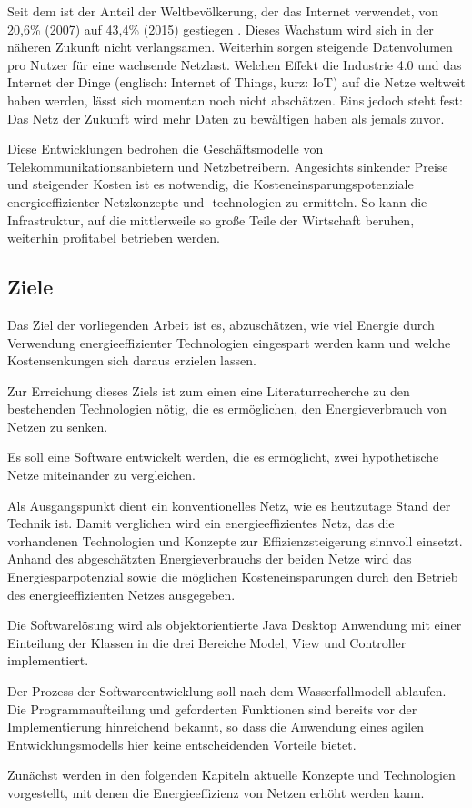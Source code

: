 Seit dem ist der Anteil der Weltbevölkerung, der das Internet verwendet, von 20,6\% (2007) auf 43,4\% (2015) gestiegen \cite{itu}. Dieses Wachstum wird sich in der näheren Zukunft nicht verlangsamen. Weiterhin sorgen steigende Datenvolumen pro Nutzer für eine wachsende Netzlast. Welchen Effekt die Industrie 4.0 und das Internet der Dinge (englisch: Internet of Things, kurz: IoT) auf die Netze weltweit haben werden, lässt sich momentan  noch nicht abschätzen. Eins jedoch steht fest: Das Netz der Zukunft wird mehr Daten zu bewältigen haben als jemals zuvor.

Diese Entwicklungen bedrohen die Geschäftsmodelle von Telekommunikationsanbietern und Netzbetreibern. Angesichts sinkender Preise und steigender Kosten ist es notwendig, die  Kosteneinsparungspotenziale energieeffizienter Netzkonzepte und -technologien zu ermitteln. So kann die Infrastruktur, auf die mittlerweile so große Teile der Wirtschaft beruhen, weiterhin profitabel betrieben werden.

\subsection{Ziele}
Das Ziel der vorliegenden Arbeit ist es, abzuschätzen, wie viel Energie  durch Verwendung energieeffizienter Technologien eingespart werden kann und welche Kostensenkungen sich daraus erzielen lassen.

Zur Erreichung dieses Ziels ist zum einen eine Literaturrecherche zu den bestehenden Technologien nötig, die es ermöglichen, den Energieverbrauch von Netzen zu senken.

Es soll eine Software entwickelt werden, die es ermöglicht, zwei hypothetische Netze miteinander zu vergleichen.

Als Ausgangspunkt dient ein konventionelles Netz, wie es heutzutage Stand der Technik ist. Damit verglichen wird ein energieeffizientes Netz, das die vorhandenen Technologien und Konzepte zur Effizienzsteigerung sinnvoll einsetzt. Anhand des abgeschätzten Energieverbrauchs der beiden Netze wird das Energiesparpotenzial sowie die möglichen Kosteneinsparungen durch den Betrieb des energieeffizienten Netzes ausgegeben. 

Die Softwarelösung wird als objektorientierte Java Desktop Anwendung mit einer Einteilung der Klassen in die drei Bereiche Model, View und Controller implementiert.

Der Prozess der Softwareentwicklung soll nach dem Wasserfallmodell ablaufen. Die Programmaufteilung und geforderten Funktionen sind bereits vor der Implementierung hinreichend bekannt, so dass die Anwendung eines agilen Entwicklungsmodells hier keine entscheidenden Vorteile bietet. 

Zunächst werden in den folgenden Kapiteln aktuelle Konzepte und Technologien vorgestellt, mit denen die Energieeffizienz von Netzen erhöht werden kann.
